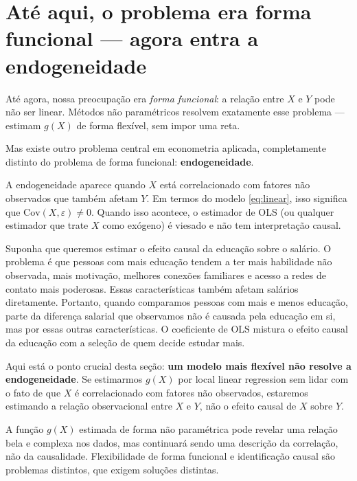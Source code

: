 \chapter{Até aqui, o problema era forma funcional --- agora entra a endogeneidade}

Até agora, nossa preocupação era \emph{forma funcional}: a relação entre $X$ e $Y$
pode não ser linear. Métodos não paramétricos resolvem exatamente esse problema ---
estimam $g(X)$ de forma flexível, sem impor uma reta.

Mas existe outro problema central em econometria aplicada, completamente distinto do
problema de forma funcional: \textbf{endogeneidade}.

A endogeneidade aparece quando $X$ está correlacionado com fatores não observados que
também afetam $Y$. Em termos do modelo \eqref{eq:linear}, isso significa que
$\mathrm{Cov}(X, \varepsilon) \neq 0$. Quando isso acontece, o estimador de OLS
(ou qualquer estimador que trate $X$ como exógeno) é viesado e não tem interpretação
causal.

\begin{exemplobox}
Suponha que queremos estimar o efeito causal da educação sobre o salário. O problema é
que pessoas com mais educação tendem a ter mais habilidade não observada, mais motivação,
melhores conexões familiares e acesso a redes de contato mais poderosas. Essas
características também afetam salários diretamente. Portanto, quando comparamos pessoas
com mais e menos educação, parte da diferença salarial que observamos não é causada pela
educação em si, mas por essas outras características. O coeficiente de OLS mistura o
efeito causal da educação com a seleção de quem decide estudar mais.
\end{exemplobox}

Aqui está o ponto crucial desta seção: \textbf{um modelo mais flexível não resolve
a endogeneidade}. Se estimarmos $g(X)$ por local linear regression sem lidar com o
fato de que $X$ é correlacionado com fatores não observados, estaremos estimando
a relação observacional entre $X$ e $Y$, não o efeito causal de $X$ sobre $Y$.

A função $g(X)$ estimada de forma não paramétrica pode revelar uma relação bela e
complexa nos dados, mas continuará sendo uma descrição da correlação, não da
causalidade. Flexibilidade de forma funcional e identificação causal são problemas
distintos, que exigem soluções distintas.

